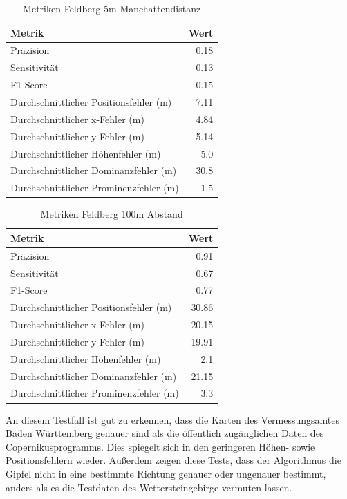 \begin{table}[htbp]
\centering
\caption{Metriken Feldberg 5m Manchattendistanz}
\label{tab:metrics_Feldberg_5m}
\begin{tabular}{|l|r|}
\hline
Metrik & Wert \\
\hline
Präzision & 0.18 \\
\hline
Sensitivität & 0.13 \\
\hline
F1-Score & 0.15 \\
\hline
Durchschnittlicher Positionsfehler (m) & 7.11 \\
\hline
Durchschnittlicher x-Fehler (m) & 4.84 \\
\hline
Durchschnittlicher y-Fehler (m) & 5.14 \\
\hline
Durchschnittlicher Höhenfehler (m) & 5.0 \\
\hline
Durchschnittlicher Dominanzfehler (m) & 30.8 \\
\hline
Durchschnittlicher Prominenzfehler (m) & 1.5 \\
\hline
\end{tabular}
\end{table}

\begin{table}[htbp]
\centering
\caption{Metriken Feldberg 100m Abstand}
\label{tab:metrics_Felbgerg_100m}
\begin{tabular}{|l|r|}
\hline
Metrik & Wert \\
\hline
Präzision & 0.91 \\
\hline
Sensitivität & 0.67 \\
\hline
F1-Score & 0.77 \\
\hline
Durchschnittlicher Positionsfehler (m) & 30.86 \\
\hline
Durchschnittlicher x-Fehler (m) & 20.15 \\
\hline
Durchschnittlicher y-Fehler (m) & 19.91 \\
\hline
Durchschnittlicher Höhenfehler (m) & 2.1 \\
\hline
Durchschnittlicher Dominanzfehler (m) & 21.15 \\
\hline
Durchschnittlicher Prominenzfehler (m) & 3.3 \\
\hline
\end{tabular}
\end{table}

An diesem Testfall ist gut zu erkennen, dass die Karten des Vermessungsamtes Baden Württemberg genauer sind als die öffentlich zugänglichen Daten des Copernikusprogramms. Dies spiegelt sich in den geringeren Höhen- sowie Positionsfehlern wieder. Außerdem zeigen diese Tests, dass der Algorithmus die Gipfel nicht in eine bestimmte Richtung genauer oder ungenauer bestimmt, anders als es die Testdaten des Wettersteingebirge vermuten lassen. 

